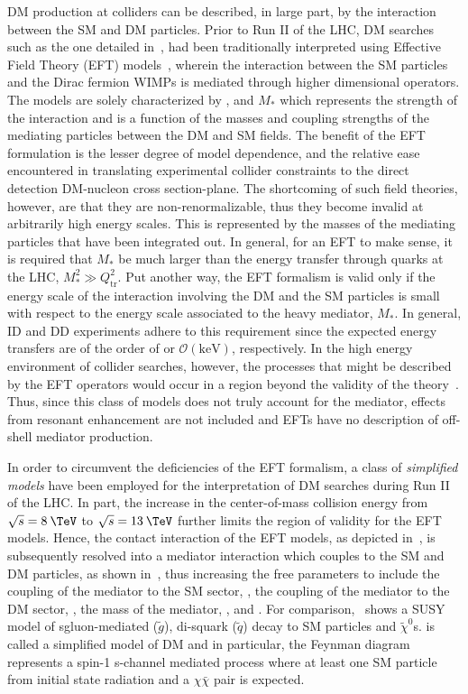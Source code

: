 DM production at colliders can be described, in large part, by the interaction between the SM and DM particles. Prior to Run II of the LHC, DM searches such as the one detailed in~\cite{Khachatryan:2016reg}, had been traditionally interpreted using Effective Field Theory (EFT) models~\cite{Goodman:2010ku}, wherein the interaction between the SM particles and the Dirac fermion WIMPs is mediated through higher dimensional operators. The models are solely characterized by \mDM, and $M_{*}$ which represents the strength of the interaction and is a function of the masses and coupling strengths of the mediating particles between the DM and SM fields. The benefit of the EFT formulation is the lesser degree of model dependence, and the relative ease encountered in translating experimental collider constraints to the direct detection DM-nucleon cross section-\mDM plane. The shortcoming of such field theories, however, are that they are non-renormalizable, thus they become invalid at arbitrarily high energy scales. This is represented by the masses of the mediating particles that have been integrated out. In general, for an EFT to make sense, it is required that $M_{*}$ be much larger than the energy transfer through quarks at the LHC, $M_{*}^{2} \gg Q_{\textrm{tr}}^{2}$. Put another way, the EFT formalism is valid only if the energy scale of the interaction involving the DM and the SM particles is small with respect to the energy scale associated to the heavy mediator, $M_{*}$. In general, ID and DD experiments adhere to this requirement since the expected energy transfers are of the order of \mDM or $\mathcal{O}(\mathrm{keV})$, respectively. In the high energy environment of collider searches, however, the processes that might be described by the EFT operators would occur in a region beyond the validity of the theory~\cite{BUSONI2014412}. Thus, since this class of models does not truly account for the mediator, effects from resonant enhancement are not included and EFTs have no description of off-shell mediator production.

In order to circumvent the deficiencies of the EFT formalism, a class of \textit{simplified models} have been employed for the interpretation of DM searches during Run II of the LHC. In part, the increase in the center-of-mass collision energy from $\sqrt{s}=8\:\TeV$ to $\sqrt{s}=13\:\TeV$ further limits the region of validity for the EFT models. Hence, the contact interaction of the EFT models, as depicted in~, is subsequently resolved into a mediator interaction which couples to the SM and DM particles, as shown in~, thus increasing the free parameters to include the coupling of the mediator to the SM sector, \gq, the coupling of the mediator to the DM sector, \gDM, the mass of the mediator, \mMed, and \mDM. For comparison,~ shows a SUSY model of sgluon-mediated ($\tilde{g}$), di-squark ($\tilde{q}$) decay to SM particles and $\tilde{\chi}^0$s. is called a simplified model of DM and in particular, the Feynman diagram represents a spin-1 s-channel mediated process where at least one SM particle from initial state radiation and a $\chi\bar{\chi}$ pair is expected.

